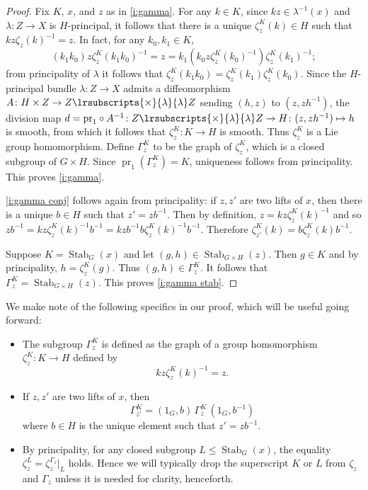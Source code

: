 \documentclass[12pt,reqno]{amsart}
\newcommand{\printname}[1]{}
\renewcommand{\printname}[1]
	{{\color{brown}{\makebox[0pt]{\hspace{-1in}\raisebox{8pt}{\tiny #1}}}}}
\newcommand{\labell}[1]{\label{#1} \printname{#1}}
\newcommand{\pr}{{\operatorname{pr}}} %
\newcommand{\Stab}{{\operatorname{Stab}}} %
\newcommand{\ftimes}[2]{{\lrsubscripts{\times}{#1}{#2}}} %
\theoremstyle{plain}
\theoremstyle{definition}
\newenvironment{remark}
		{\pushQED{\qed}\renewcommand{\qedsymbol}{$\lrcorner$}\remarkx}
		{\popQED\endremarkx}
\begin{document}
    \begin{proof}
        Fix $K$, $x$, and $z$ as in \cref{i:gamma}.  For any $k\in K$, since $kz\in\lambda^{-1}(x)$ and $\lambda\colon Z\to X$ is $H$-principal, it follows that there is a unique $\zeta^K_z(k)\in H$ such that $kz\zeta_z(k)^{-1}=z$.  In fact, for any $k_0,k_1\in K$, $$(k_1k_0)z\zeta^K_z(k_1k_0)^{-1}=z=k_1\left(k_0z\zeta^K_z(k_0)^{-1}\right)\zeta^K_z(k_1)^{-1};$$ from principality of $\lambda$ it follows that $\zeta^K_z(k_1k_0)=\zeta^K_z(k_1)\zeta^K_z(k_0)$.   Since the $H$-principal bundle $\lambda\colon Z\to X$ admits a diffeomorphism $A\colon H\times Z\to Z\ftimes{\lambda}{\lambda}Z$ sending $(h,z)$ to $(z,zh^{-1})$, the division map $d=\pr_1\circ A^{-1}\colon Z\ftimes{\lambda}{\lambda}Z\to H\colon(z,zh^{-1})\mapsto h$ is smooth, from which it follows that  $\zeta^K_z\colon K\to H$ is smooth.  Thus $\zeta^K_z$ is a Lie group homomorphism.  Define $\Gamma^K_z$ to be the graph of $\zeta^K_z$, which is a closed subgroup of $G\times H$.  Since $\pr_1(\Gamma^K_z)=K$, uniqueness follows from principality.  This proves \cref{i:gamma}.

        \cref{i:gamma conj} follows again from principality:   if $z, z'$ are two lifts of $x$, then there is a unique $b\in H$ such that $z'=zb^{-1}$.  Then by definition, $z = k z \zeta^K_z(k)^{-1}$ and so $zb^{-1}  = kz\zeta^K_z(k)^{-1} b^{-1} = kzb^{-1} b \zeta^K_z(k)^{-1} b^{-1}  $.   Therefore $\zeta^K_{z'}(k) = b \zeta^K_z(k)b^{-1}$. 

        Suppose $K=\Stab_G(x)$ and let $(g,h)\in\Stab_{G\times H}(z)$.  Then $g\in K$ and by principality, $h=\zeta^K_z(g)$.  Thus $(g,h)\in\Gamma^K_z$.  It follows that $\Gamma^K_z=\Stab_{G\times H}(z)$.    This proves \cref{i:gamma stab}.
    \end{proof}
    
    \begin{remark}\labell{r:gamma}  We make note of the following specifics in our proof, which will be useful going forward:  
        \begin{itemize}
            \item  The subgroup $\Gamma^K_z$ is defined as the  graph of a group homomorphism $\zeta^K_z\colon K\to H$ defined by $$kz\zeta^K_z(k)^{-1}=z.$$ 
            \item If $z, z'$ are two lifts of $x$,  then   $$\Gamma^K_{z'}=(1_G,b)\,\Gamma^K_z\,(1_G,b^{-1})$$ where $b \in  H$ is the unique element  such that $z'=zb^{-1}$.  
            \item By principality,  for any closed subgroup $L\leq\Stab_G(x)$, the equality $\zeta^L_z=\zeta^{\Gamma_z}_z|_L$ holds.   Hence  we will typically drop the superscript $K$ or $L$ from $\zeta_z$ and $\Gamma_z$ unless it is needed for clarity, henceforth. \qedhere
        \end{itemize}
    \end{remark}
\end{document}

